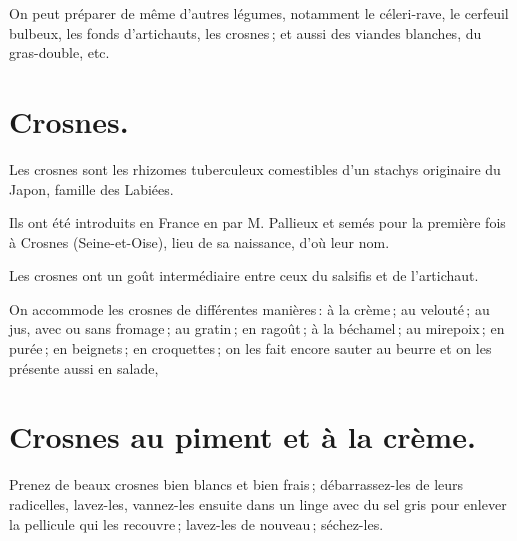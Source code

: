 \sk


On peut préparer de même d’autres légumes, notamment le céleri-rave, le
cerfeuil bulbeux, les fonds d'artichauts, les crosnes ; et aussi des viandes
blanches, du gras-double, etc.

\section*{\centering Crosnes.}
{}

Les crosnes sont les rhizomes tuberculeux comestibles d'un stachys originaire
du Japon, famille des Labiées.

Ils ont été introduits en France en {\mmm} par M. Pallieux et semés
pour la première fois à Crosnes (Seine-et-Oise), lieu de sa naissance, d'où
leur nom.

Les crosnes ont un goût intermédiaire entre ceux du salsifis et de l’artichaut.

On accommode les crosnes de différentes manières : à la crème ; au velouté ; au
jus, avec ou sans fromage ; au gratin ; en ragoût ; à la béchamel ; au
mirepoix ; en purée ; en beignets ; en croquettes ; on les fait encore sauter
au beurre et on les présente aussi en salade,

\section*{\centering Crosnes au piment et à la crème.}
{}

Prenez de beaux crosnes bien blancs et bien frais ; débarrassez-les de leurs
radicelles, lavez-les, vannez-les ensuite dans un linge avec du sel gris pour
enlever la pellicule qui les recouvre ; lavez-les de nouveau ; séchez-les.

